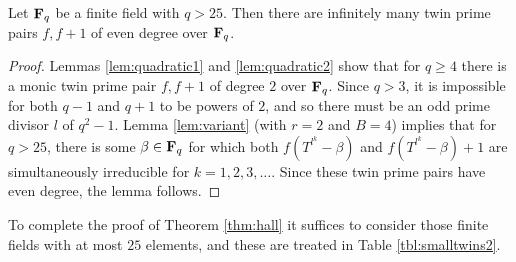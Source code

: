 \documentclass[a4paper]{compositio}
\begin{document}
\begin{lem} Let $\mathbf{F}_q$ be a finite field with $q > 25$. Then there
are infinitely many twin prime pairs $f, f+1$ of even degree over
$\mathbf{F}_q$.
\end{lem}
\begin{proof} Lemmas \ref{lem:quadratic1} and
\ref{lem:quadratic2} show that for $q \geq 4$ there is a monic twin
prime pair $f,f+1$ of degree $2$ over $\mathbf{F}_q$. Since $q > 3$, it is
impossible for both $q-1$ and $q+1$ to be powers of $2$, and so
there must be an odd prime divisor $l$ of $q^2-1$. Lemma
\ref{lem:variant} (with $r=2$ and $B=4$) implies that for $q> 25$,
there is some $\beta \in \mathbf{F}_q$ for which both $f(T^{l^k}-\beta)$ and
$f(T^{l^k}-\beta)+1$ are simultaneously irreducible for $k= 1, 2, 3,
\dots$. Since these twin prime pairs have even degree, the lemma
follows.
\end{proof}

To complete the proof of Theorem \ref{thm:hall} it suffices to
consider those finite fields with at most $25$ elements, and these
are treated in Table \ref{tbl:smalltwins2}.
\end{document}
